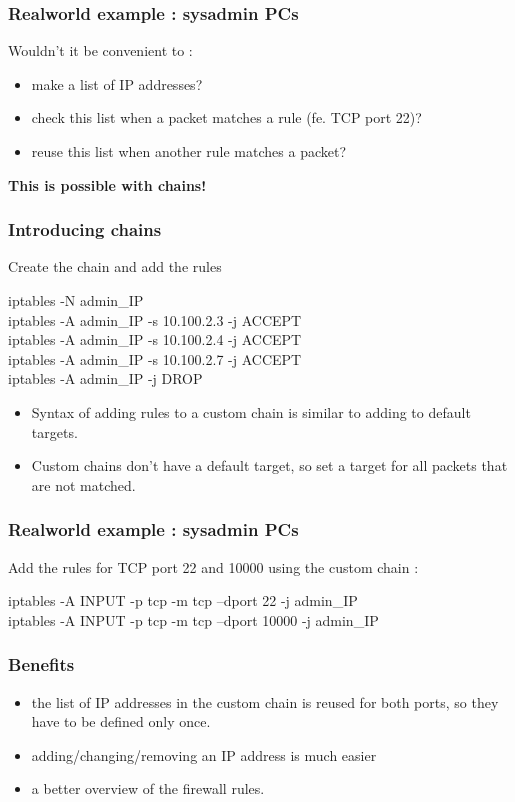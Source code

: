 \documentclass[14pt]{beamer}
\begin{document}
  \begin{frame}
    \frametitle{Realworld example : sysadmin PCs}
    Wouldn't it be convenient to :
    \begin{itemize}
      \item make a list of IP addresses?
      \item check this list when a packet matches a rule (fe. TCP port 22)?
      \item reuse this list when another rule matches a packet?
    \end{itemize}
    \pause
    \textbf{This is possible with chains!}
  \end{frame}
  \begin{frame}
    \frametitle{Introducing chains}
    Create the chain and add the rules
    \begin{example}
      \small{iptables -N admin\_IP\\
      \pause
      iptables -A admin\_IP -s 10.100.2.3 -j ACCEPT\\
      iptables -A admin\_IP -s 10.100.2.4 -j ACCEPT\\
      iptables -A admin\_IP -s 10.100.2.7 -j ACCEPT\\
      iptables -A admin\_IP -j DROP}
    \end{example}
    \pause
    \begin{itemize}[<+->]
      \item Syntax of adding rules to a custom chain is similar to adding to default targets.
      \item Custom chains don't have a default target, so set a target for all packets that are not matched.
    \end{itemize}
  \end{frame}
  \begin{frame}
    \frametitle{Realworld example : sysadmin PCs}
    Add the rules for TCP port 22 and 10000 using the custom chain :
    \begin{example}
      \small{iptables -A INPUT -p tcp -m tcp --dport 22 -j admin\_IP\\
      iptables -A INPUT -p tcp -m tcp --dport 10000 -j admin\_IP}
    \end{example}
  \end{frame}
  \begin{frame}
    \frametitle{Benefits}
    \begin{itemize}
      \item the list of IP addresses in the custom chain is reused for both ports, so they have to be defined only once.
      \item adding/changing/removing an IP address is much easier
      \item a better overview of the firewall rules.
    \end{itemize}
  \end{frame}
\end{document}
